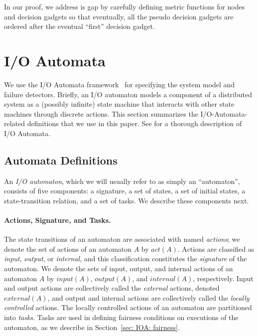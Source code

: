 \documentclass[11pt]{article}
\numberwithin{theorem}{section}
\begin{document}
In our proof, we address is gap by carefully defining metric functions for nodes and decision gadgets so that eventually, all the pseudo decision gadgets are ordered after the eventual ``first'' decision gadget.

\section{I/O Automata}\label{sec:ioautomata}

We use the I/O Automata framework~\cite{lynch:hapf,lynch:aiti,lync:da}
for specifying the system model and failure detectors. 
Briefly, an I/O automaton models a component of a distributed system
as a (possibly infinite) state machine that interacts with other state
machines through discrete actions. 
This section summarizes the I/O-Automata-related definitions that we
use in this paper. 
See \cite[Chapter 8]{lync:da} for a thorough description of I/O
Automata.

\subsection{Automata Definitions}
\label{sec: IOA: automata-defs}

An \emph{I/O automaton}, which we will usually refer to as simply an
``automaton'', consists of five components:
a signature, a set of states, a set of initial states, a
state-transition relation, and a set of tasks. 
We describe these components next.

\paragraph{Actions, Signature, and Tasks.} 
The state transitions of an automaton are associated with named
\emph{actions}; we denote the set of actions of an automaton $A$ by
$act(A)$.
Actions are classified as \emph{input}, \emph{output}, or
\emph{internal}, and this classification constitutes the
\emph{signature} of the automaton. 
We denote the sets of input, output, and internal actions of an
automaton $A$ by $input(A)$, $output(A)$, and $internal(A)$,
respectively. 
Input and output actions are collectively called the \emph{external}
actions, denoted $external(A)$, and output and internal actions are
collectively called the \emph{locally controlled} actions. 
The locally controlled actions of an automaton are partitioned into
\emph{tasks}. 
Tasks are used in defining fairness conditions on executions of the
automaton, as we describe in Section~\ref{sec: IOA: fairness}.
\end{document}
